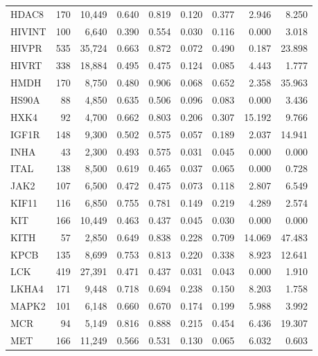 \begin{center}
\begin{footnotesize}
\begin{longtable}{lrrrrrrrr}
			HDAC8  & 170   & 10,449   & 0.640   & 0.819   & 0.120   & 0.377   & 2.946   & 8.250  \\
			HIVINT & 100   & 6,640    & 0.390   & 0.554   & 0.030   & 0.116   & 0.000   & 3.018  \\
			HIVPR  & 535   & 35,724   & 0.663   & 0.872   & 0.072   & 0.490   & 0.187   & 23.898 \\
			HIVRT  & 338   & 18,884   & 0.495   & 0.475   & 0.124   & 0.085   & 4.443   & 1.777  \\
			HMDH   & 170   & 8,750    & 0.480   & 0.906   & 0.068   & 0.652   & 2.358   & 35.963 \\
			HS90A  & 88    & 4,850    & 0.635   & 0.506   & 0.096   & 0.083   & 0.000   & 3.436  \\
			HXK4   & 92    & 4,700    & 0.662   & 0.803   & 0.206   & 0.307   & 15.192  & 9.766  \\
			IGF1R  & 148   & 9,300    & 0.502   & 0.575   & 0.057   & 0.189   & 2.037   & 14.941 \\
			INHA   & 43    & 2,300    & 0.493   & 0.575   & 0.031   & 0.045   & 0.000   & 0.000  \\
			ITAL   & 138   & 8,500    & 0.619   & 0.465   & 0.037   & 0.065   & 0.000   & 0.728  \\
			JAK2   & 107   & 6,500    & 0.472   & 0.475   & 0.073   & 0.118   & 2.807   & 6.549  \\
			KIF11  & 116   & 6,850    & 0.755   & 0.781   & 0.149   & 0.219   & 4.289   & 2.574  \\
			KIT    & 166   & 10,449   & 0.463   & 0.437   & 0.045   & 0.030   & 0.000   & 0.000  \\
			KITH   & 57    & 2,850    & 0.649   & 0.838   & 0.228   & 0.709   & 14.069  & 47.483 \\
			KPCB   & 135   & 8,699    & 0.753   & 0.813   & 0.220   & 0.338   & 8.923   & 12.641 \\
			LCK    & 419   & 27,391   & 0.471   & 0.437   & 0.031   & 0.043   & 0.000   & 1.910  \\
			LKHA4  & 171   & 9,448    & 0.718   & 0.694   & 0.238   & 0.150   & 8.203   & 1.758  \\
			MAPK2  & 101   & 6,148    & 0.660   & 0.670   & 0.174   & 0.199   & 5.988   & 3.992  \\
			MCR    & 94    & 5,149    & 0.816   & 0.888   & 0.215   & 0.454   & 6.436   & 19.307 \\
			MET    & 166   & 11,249   & 0.566   & 0.531   & 0.130   & 0.065   & 6.032   & 0.603  \\

\end{longtable}
\end{footnotesize}
\end{center}

